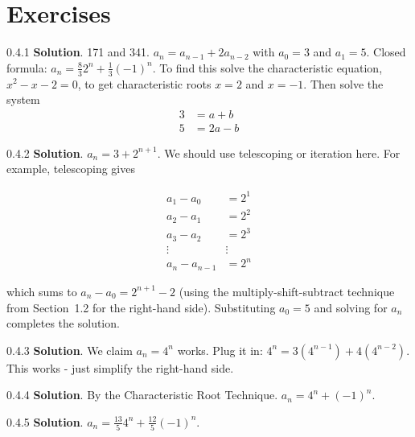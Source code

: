 \documentclass[11pt,]{book}
\theoremstyle{ptxplainnotitle}
\theoremstyle{ptxplaintitle}
\theoremstyle{ptxdefinitionnotitle}
\theoremstyle{ptxdefinitiontitle}
\theoremstyle{ptxdefinitionnotitle}
\theoremstyle{ptxdefinitiontitle}
\theoremstyle{ptxdefinitionnotitle}
\theoremstyle{ptxdefinitiontitle}
\theoremstyle{ptxdefinitiontitlenonumber}
\theoremstyle{ptxdefinitiontitlenonumber}
\numberwithin{equation}{chapter}
\newcommand{\amp}{&}
\begin{document}
\section*{Exercises}
\begin{divisionexercise}{0.4.1}
\textbf{Solution}.\quad%
\hypertarget{p-491}{}%
171 and 341. \(a_n = a_{n-1} + 2a_{n-2}\) with \(a_0 = 3\) and \(a_1 = 5\). Closed formula: \(a_n = \frac{8}{3}2^n + \frac{1}{3}(-1)^n\).  To find this solve the characteristic equation, \(x^2 - x - 2 = 0\), to get characteristic roots \(x = 2\) and \(x=-1\).  Then solve the system%
\begin{align*}
3 \amp = a + b\\
5 \amp = 2a - b
\end{align*}
%
\end{divisionexercise}%
\begin{divisionexercise}{0.4.2}
\textbf{Solution}.\quad%
\hypertarget{p-497}{}%
\(a_n = 3 + 2^{n+1}\text{.}\)  We should use telescoping or iteration here.  For example, telescoping gives%
\par
\hypertarget{p-498}{}%
%
\begin{equation*}
\begin{aligned}
a_1 - a_0 \amp = 2^1\\
a_2 - a_1 \amp = 2^2\\
a_3 - a_2 \amp = 2^3\\
\vdots\amp \vdots \\
a_n - a_{n-1} \amp = 2^n
\end{aligned}
\end{equation*}
%
\par
\hypertarget{p-499}{}%
which sums to \(a_n - a_0 = 2^{n+1} - 2\) (using the multiply-shift-subtract technique from Section~1.2 for the right-hand side).  Substituting \(a_0 = 5\) and solving for \(a_n\) completes the solution.%
\end{divisionexercise}%
\begin{divisionexercise}{0.4.3}
\textbf{Solution}.\quad%
\hypertarget{p-501}{}%
We claim \(a_n = 4^n\) works. Plug it in: \(4^n = 3(4^{n-1}) + 4(4^{n-2})\). This works - just simplify the right-hand side.%
\end{divisionexercise}%
\begin{divisionexercise}{0.4.4}
\textbf{Solution}.\quad%
\hypertarget{p-505}{}%
By the Characteristic Root Technique. \(a_n = 4^n + (-1)^n\text{.}\)%
\end{divisionexercise}%
\begin{divisionexercise}{0.4.5}
\textbf{Solution}.\quad%
\hypertarget{p-509}{}%
\(a_n = \frac{13}{5} 4^n + \frac{12}{5} (-1)^n\text{.}\)%
\end{divisionexercise}%
\end{document}
